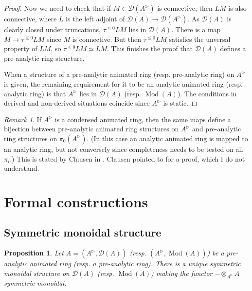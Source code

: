 \documentclass{article}
\theoremstyle{plain}
\newtheorem{prop}[thm]{Proposition}
\theoremstyle{definition}
\theoremstyle{remark}
\newtheorem{rmk}[thm]{Remark}
\DeclareMathOperator{\modcat}{Mod}
\newcommand{\huflag}{\triangleright}
\newcommand{\D}{\mathcal{D}}
\newcommand{\resp}[1]{{\color{respcolor}(resp. #1)}}
\begin{document}
\begin{proof}
Now we need to check that if $ M\in \D (A ^{\huflag}) $ is connective, then $ LM $ is also connective, where $ L $ is the left adjoint
of $ \D (A)\to \D (A ^{\huflag}) $.
As $ \D (A) $ is clearly closed under truncations, $ \tau ^{\leq 0} L M $ lies in $ \D (A) $.
There is a map $ M\to \tau ^{\leq 0}LM $ since $ M $ is connective.
But then $ \tau ^{\leq 0}LM $ satisfies the unversal property of $ LM $,
so $ \tau ^{\leq 0}LM\simeq LM $.
This finishes the proof that $ \D (A) $ defines a pre-analytic ring structure.

When a structure of a pre-analytic animated ring \resp{pre-analytic ring} on $ A ^{\huflag} $ is given,
the remaining requirement for it to be an analytic animated ring \resp{analytic ring} is that $ A ^{\huflag} $ lies in
$ \D (A) $ \resp{$ \modcat (A) $}. The conditions in derived and non-derived situations coincide since $ A ^{\huflag} $ is static.
\end{proof}

\begin{rmk}
If $ A ^{\huflag} $ is a condensed animated ring, then the same maps define a bijection between pre-analytic animated ring structures on
$ A ^{\huflag} $ and pre-analytic ring structures on $ \pi _{0}(A ^{\huflag}) $.
(In this case an analytic animated ring is mapped to an analytic ring, but not conversely since completeness needs to be tested on all $ \pi _{i} $.)
This is stated by Clausen in
\cite[\href{https://www.youtube.com/watch?v=38PzTzCiMow\&list=PLx5f8IelFRgGmu6gmL-Kf\_Rl\_6Mm7juZO\&index=13\&t=2099s}{Video 13, 34:59}]{ihesvid}.
Clausen pointed to \cite{analytic} for a proof, which I do not understand.
\label{definition::animated}
\end{rmk}

\section{Formal constructions}

\subsection{Symmetric monoidal structure}
\begin{prop}
Let $ A = (A ^{\huflag}, \D (A)) $ \resp{$ (A ^{\huflag}, \modcat (A)) $} be a pre-analytic animated ring \resp{a pre-analytic ring}.
There is a unique symmetric monoidal structure on $ \D (A) $ \resp{$ \modcat (A) $} making the functor $ -\otimes _{A ^{\huflag}} A $ symmetric monoidal.
\end{prop}
\end{document}
